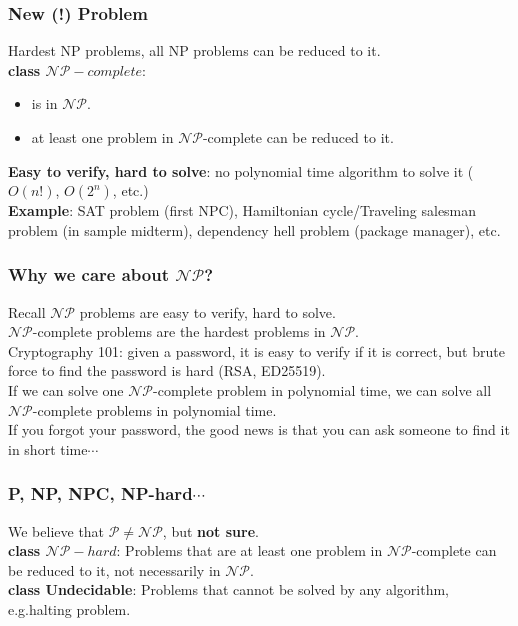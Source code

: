 \documentclass[t]{beamer}
\begin{document}
        \begin{frame}
            \frametitle{New (!) Problem}
             Hardest NP problems, all NP problems can be reduced to it.\\
             \textbf{class $\mathcal{NP}-complete$}:
            \begin{itemize}
                \item<3-> is in $\mathcal{NP}$.
                \item<4-> at least one problem in $\mathcal{NP}$-complete can be reduced to it.
            \end{itemize}

            \bigskip
             \textbf{Easy to verify, hard to solve}: no polynomial time algorithm to solve it ($O(n!)$, $O(2^n)$, etc.)\\
             \textbf{Example}: SAT problem (first NPC), Hamiltonian cycle/Traveling salesman problem (in sample midterm), dependency hell problem (package manager), etc.
        \end{frame}

        \begin{frame}
            \frametitle{Why we care about $\mathcal{NP}$?}
             Recall $\mathcal{NP}$ problems are easy to verify, hard to solve.\\
             $\mathcal{NP}$-complete problems are the hardest problems in $\mathcal{NP}$.\\

            \bigskip
             Cryptography 101: given a password, it is easy to verify if it is correct, but brute force to find the password is hard (RSA, ED25519).\\
             If we can solve one $\mathcal{NP}$-complete problem in polynomial time, we can solve all $\mathcal{NP}$-complete problems in polynomial time.\\
             If you forgot your password, the good news is that you can ask someone to find it in short time$\cdots$\\
        \end{frame}

        \begin{frame}
            \frametitle{P, NP, NPC, NP-hard$\cdots$}
            We believe that $\mathcal{P} \neq \mathcal{NP}$, but \textbf{not sure}.\\

            \bigskip
             \textbf{class $\mathcal{NP}-hard$}: Problems that are at least one problem in $\mathcal{NP}$-complete can be reduced to it, not necessarily in $\mathcal{NP}$.\\
             \textbf{class Undecidable}: Problems that cannot be solved by any algorithm, e.g.halting problem.\\
        \end{frame}

\end{document}
